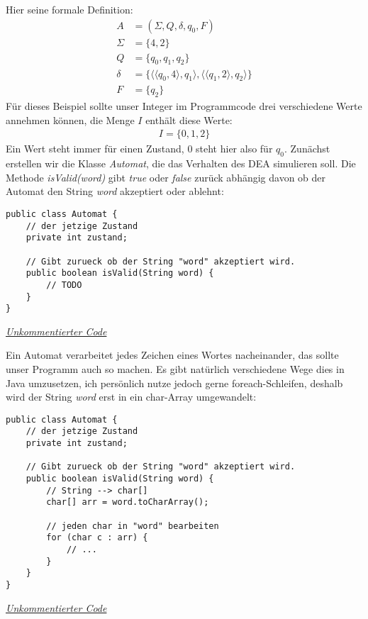 \begin{flushleft}
    Hier seine formale Definition:
    \begin{align}
        A &= (\Sigma,Q,\delta,q_0,F) \\
        \Sigma &= \{4,2\} \\
        Q &= \{q_0,q_1,q_2\} \\
        \delta &= \{\langle \langle q_0, 4 \rangle, q_1 \rangle, \langle \langle q_1, 2 \rangle, q_2 \rangle \} \\
        F &= \{q_2\}
    \end{align}
    Für dieses Beispiel sollte unser Integer im Programmcode drei verschiedene Werte annehmen können,
    die Menge $I$ enthält diese Werte:
    \begin{align}
        I=\{0,1,2\}
    \end{align}
    Ein Wert steht immer für einen Zustand, $0$ steht hier also für $q_0$.
    Zunächst erstellen wir die Klasse \textit{Automat}, die das Verhalten des DEA simulieren soll.
    Die Methode \textit{isValid(word)} gibt \textit{true} oder \textit{false} zurück abhängig davon ob der Automat den String \textit{word} akzeptiert oder ablehnt:
\end{flushleft}

\begin{center}  
\begin{lstlisting}
public class Automat {
    // der jetzige Zustand
    private int zustand;

    // Gibt zurueck ob der String "word" akzeptiert wird.
    public boolean isValid(String word) {
        // TODO
    }
}
\end{lstlisting}
\href{https://raw.githubusercontent.com/tim-tm/informatik-notes/main/code/Automat.java}{\textit{Unkommentierter Code}} \\
\end{center}

\begin{flushleft}
    Ein Automat verarbeitet jedes Zeichen eines Wortes nacheinander, das sollte unser Programm auch so machen.
    Es gibt natürlich verschiedene Wege dies in Java umzusetzen, ich persönlich nutze jedoch gerne foreach-Schleifen,
    deshalb wird der String \textit{word} erst in ein char-Array umgewandelt:
\end{flushleft}

\begin{center}
\begin{lstlisting}
public class Automat {
    // der jetzige Zustand
    private int zustand;

    // Gibt zurueck ob der String "word" akzeptiert wird.
    public boolean isValid(String word) {
        // String --> char[]
        char[] arr = word.toCharArray();

        // jeden char in "word" bearbeiten
        for (char c : arr) {
            // ...
        }
    }
}
\end{lstlisting}
\href{https://raw.githubusercontent.com/tim-tm/informatik-notes/main/code/Automat.java}{\textit{Unkommentierter Code}} \\
\end{center}

